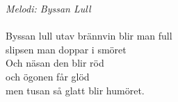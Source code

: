 {\footnotesize\textit{Melodi: Byssan Lull}}\\
\\
\revrpt Byssan lull utav brännvin blir man full\\
slipsen man doppar i smöret \rpt \\
Och näsan den blir röd\\
och ögonen får glöd\\
men tusan så glatt blir humöret.
